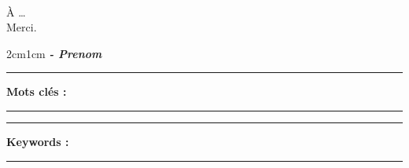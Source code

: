 \documentclass{iid}
\begin{document}
\pageDeGarde
\pagecolor{white}
\thispagestyle{empty}\ \clearpage

\newpage
{}
\setcounter{tocdepth}{0}
\setcounter{tocdepth}{5}

\dedicace
\begin{fquote}
\begin{center}
\large{
\uppercase{à} \ldots\\[12pt]
Merci.
}
\end{center}
\end{fquote}
\begin{adjustwidth}{2cm}{1cm}
\hspace*{\fill} \textbf{\textit{\large{- Prenom}}}
\end{adjustwidth}
\clearpage

\remerciements
\newpage

\resume
\vspace{1cm}
\noindent\rule[2pt]{\textwidth}{0.5pt}
{\textbf{Mots clés :}}
\\
\noindent\rule[2pt]{\textwidth}{0.5pt}
\clearpage

\resumeAn
\vspace{1cm}
\noindent\rule[2pt]{\textwidth}{0.5pt}
{\textbf{Keywords :}}
\\
\noindent\rule[2pt]{\textwidth}{0.5pt}
\newpage
\end{document}
